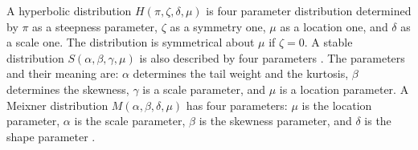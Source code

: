 \documentclass{llncs}
\begin{document}
A hyperbolic distribution $H(\pi, \zeta, \delta, \mu)$ is four parameter distribution \cite{Barndoff1983} determined by $\pi$ as a steepness parameter, $\zeta$ as a symmetry one, $\mu$ as a location one, and $\delta$ as a scale one. %
The distribution is symmetrical about 
$\mu$ if $\zeta=0$.
%
A stable distribution $S(\alpha, \beta, \gamma, \mu)$ is also described by four parameters \cite{Rachev2005, Nolan2009, Stoyanov2013}. The parameters and their meaning are: $\alpha$ determines the tail weight and the kurtosis, $\beta$ determines the skewness, $\gamma$ is a scale parameter, and $\mu$ is a location parameter. %
%
A Meixner distribution $M(\alpha, \beta, \delta, \mu)$ has four parameters: $\mu$ is the location parameter, $\alpha$ is the scale parameter, $\beta$ is the skewness parameter, and $\delta$ is the shape parameter \cite{Schoutens2002}. %
\end{document}

